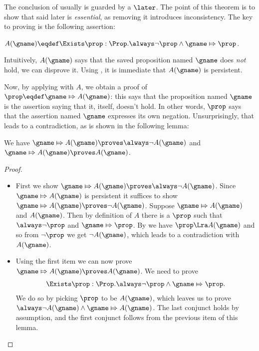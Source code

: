 The conclusion of  usually is guarded by a $\later$.
The point of this theorem is to show that said later is \emph{essential}, as removing it introduces inconsistency.
%
The key to proving  is the following assertion:
\begin{defn}
$A(\gname) \eqdef \Exists \prop : \Prop. \always\lnot \prop \land \gname \Mapsto \prop$.
\end{defn}
Intuitively, $A(\gname)$ says that the saved proposition named $\gname$ does \emph{not} hold, \ie we can disprove it.
Using , it is immediate that $A(\gname)$ is persistent.

Now, by applying  with $A$, we obtain a proof of $\prop \eqdef \gname \Mapsto A(\gname)$: this says that the proposition named $\gname$ is the assertion saying that it, itself, doesn't hold.
In other words, $\prop$ says that the assertion named $\gname$ expresses its own negation.
Unsurprisingly, that leads to a contradiction, as is shown in the following lemma:
\begin{lem}   \label{lem:saved-prop-counterexample-not-agname}   We have $\gname \Mapsto A(\gname) \proves \always\lnot A(\gname)$ and $\gname \Mapsto A(\gname) \proves A(\gname)$. \end{lem}
\begin{proof}%
\leavevmode
  \begin{itemize}
  \item First we show $\gname \Mapsto A(\gname) \proves \always\lnot A(\gname)$.
    Since $\gname \Mapsto A(\gname)$ is persistent it suffices to show $\gname \Mapsto A(\gname) \proves \lnot A(\gname)$.
    Suppose $\gname \Mapsto A(\gname)$ and $A(\gname)$.
    Then by definition of \(A\) there is a $\prop$ such that $\always \lnot \prop$ and $\gname \Mapsto \prop$.
    By  we have $\prop \Lra A(\gname)$ and so from $\lnot \prop$ we get $\lnot A(\gname)$, which leads to a contradiction with $A(\gname)$.
    
  \item Using the first item we can now prove $\gname \Mapsto A(\gname) \proves A(\gname)$.
    We need to prove
    \begin{align*}
      \Exists \prop : \Prop. \always \lnot \prop \land \gname \Mapsto \prop.
    \end{align*}
    We do so by picking $\prop$ to be $A(\gname)$, which leaves us to prove \(\always \lnot A(\gname) \land \gname \Mapsto A(\gname)\).
    The last conjunct holds by assumption, and the first conjunct follows from the previous item of this lemma.
  \end{itemize}
\end{proof}

